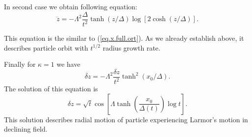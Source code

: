 \documentclass[useAMS,usenatbib]{mn2e}
\begin{document}
In second case we obtain following equation:
  \begin{equation}
\ddot{z} = -\Lambda^2\dfrac{\Delta}{t^2}\tanh(z/\Delta)\log[2\cosh(z/\Delta)].
\end{equation} 

This equation is the similar to (\ref{eq.x.full.ort}). As we already 
establish above, it describes particle orbit with $t^{1/2}$ radius growth rate.

Finally for $\kappa = 1$ we have
\begin{equation}
\ddot{\delta z}=-\Lambda^2\dfrac{\delta z}{t^2}\tanh^2(x_0/\Delta).
\end{equation}
The solution of this equation is 
\begin{equation}
\delta z=\sqrt{t}\cos\left[\Lambda
\tanh\left(\dfrac{x_0}{\Delta(t)}\right)\log t\right].
\end{equation}
  This solution describes radial motion of particle experiencing Larmor's motion in declining field.



\bsp
\label{lastpage}
\end{document}
